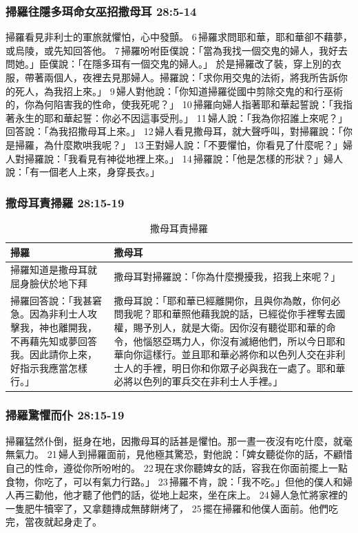 \subsubsection{掃羅往隱多珥命女巫招撒母耳 28:5-14}
掃羅看見非利士的軍旅就懼怕，心中發顫。 6 掃羅求問耶和華，耶和華卻不藉夢，或烏陵，或先知回答他。 7 掃羅吩咐臣僕說：「當為我找一個交鬼的婦人，我好去問她。」臣僕說：「在隱多珥有一個交鬼的婦人。」
於是掃羅改了裝，穿上別的衣服，帶著兩個人，夜裡去見那婦人。掃羅說：「求你用交鬼的法術，將我所告訴你的死人，為我招上來。」 9 婦人對他說：「你知道掃羅從國中剪除交鬼的和行巫術的，你為何陷害我的性命，使我死呢？」 10 掃羅向婦人指著耶和華起誓說：「我指著永生的耶和華起誓：你必不因這事受刑。」 11 婦人說：「我為你招誰上來呢？」回答說：「為我招撒母耳上來。」 12 婦人看見撒母耳，就大聲呼叫，對掃羅說：「你是掃羅，為什麼欺哄我呢？」 13 王對婦人說：「不要懼怕，你看見了什麼呢？」婦人對掃羅說：「我看見有神從地裡上來。」 14 掃羅說：「他是怎樣的形狀？」婦人說：「有一個老人上來，身穿長衣。」

\subsubsection{撒母耳責掃羅 28:15-19}
\begin{table}[H]
\hspace*{-5mm}
\centering
\begin{tabular}{p{}|p{11.25cm}}\hline\hline
掃羅&撒母耳\\\hline
掃羅知道是撒母耳就屈身臉伏於地下拜&撒母耳對掃羅說：「你為什麼攪擾我，招我上來呢？」\\\hline
掃羅回答說：「我甚窘急。因為非利士人攻擊我，神也離開我，不再藉先知或夢回答我。因此請你上來，好指示我應當怎樣行。」&撒母耳說：「耶和華已經離開你，且與你為敵，你何必問我呢？耶和華照他藉我說的話，已經從你手裡奪去國權，賜予別人，就是大衛。因你沒有聽從耶和華的命令，他惱怒亞瑪力人，你沒有滅絕他們，所以今日耶和華向你這樣行。並且耶和華必將你和以色列人交在非利士人的手裡，明日你和你眾子必與我在一處了。耶和華必將以色列的軍兵交在非利士人手裡。」\\\hline
\end{tabular}
\caption{撒母耳責掃羅}
\end{table}



\subsubsection{掃羅驚懼而仆 28:15-19}
掃羅猛然仆倒，挺身在地，因撒母耳的話甚是懼怕。那一晝一夜沒有吃什麼，就毫無氣力。 21 婦人到掃羅面前，見他極其驚恐，對他說：「婢女聽從你的話，不顧惜自己的性命，遵從你所吩咐的。 22 現在求你聽婢女的話，容我在你面前擺上一點食物，你吃了，可以有氣力行路。」 23 掃羅不肯，說：「我不吃。」但他的僕人和婦人再三勸他，他才聽了他們的話，從地上起來，坐在床上。 24 婦人急忙將家裡的一隻肥牛犢宰了，又拿麵摶成無酵餅烤了， 25 擺在掃羅和他僕人面前。他們吃完，當夜就起身走了。

